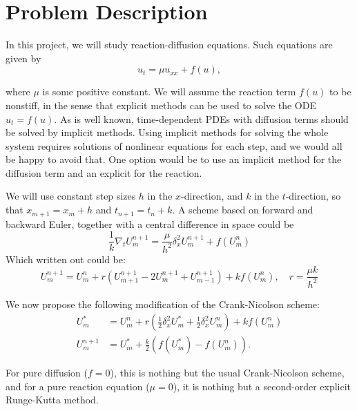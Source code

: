 \section{Problem Description}

In this project, we will study reaction-diffusion equations. Such equations are given by
\begin{equation}
  u_t = \mu u_{xx} + f(u),
\end{equation}

where $\mu$ is some positive constant.
We will assume the reaction term $f(u)$ to be nonstiff, in the sense that explicit methods can be used to solve the ODE $u_t = f(u)$. As is well known, time-dependent PDEs with diffusion terms should be solved by implicit methods. Using implicit methods for solving the whole system requires solutions of nonlinear equations for each step, and we would all be happy to avoid that. One option would be to use an implicit method for the diffusion term and an explicit for the reaction.

We will use constant step sizes $h$ in the $x$-direction, and $k$ in the $t$-direction, so that $x_{m+1} = x_m + h$ and $t_{n+1} = t_n + k$. A scheme based on forward and backward Euler, together with a central difference in space could be
\begin{equation}
  \frac{1}{k} \nabla_t U_m^{n+1}  = \frac{\mu}{h^2} \delta_x^2 U_m^{n+1} + f(U_m^n)
\end{equation}
Which written out could be:
\begin{equation}
  U_m^{n+1}  = U_m^n + r \left( U_{m+1}^{n+1} - 2 U_m^{n+1} + U_{m-1}^{n+1} \right) + k f(U_m^n), \quad r = \frac{\mu k}{h^2}
\end{equation}

We now propose the following modification of the Crank-Nicolson scheme:
\begin{align*}
  U_m^*     & = U_m^n + r \left( \frac{1}{2} \delta_x^2 U_m^* + \frac{1}{2} \delta_x^2 U_m^n \right) + k f(U_m^n) \\
  U_m^{n+1} & = U_m^* + \frac{k}{2} \left( f(U_m^*) - f(U_m^n) \right).
\end{align*}

For pure diffusion ($f = 0$), this is nothing but the usual Crank-Nicolson scheme, and for a pure reaction equation ($\mu = 0$), it is nothing but a second-order explicit Runge-Kutta method.
